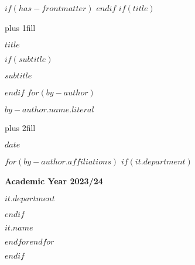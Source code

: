 $if(has-frontmatter)$
\frontmatter
$endif$
$if(title)$
\cleardoublepage
\thispagestyle{empty}
{\centering
\hbox{}\vskip 0cm plus 1fill
{\Huge\bfseries $title$ \par}
$if(subtitle)$
\vspace{3ex}
{\Large\bfseries $subtitle$ \par}
$endif$
\vspace{12ex}
$for(by-author)$
{\Large\bfseries $by-author.name.literal$ \par}
\vskip 0cm plus 2fill
{\bfseries\large $date$ \par}
\vspace{12ex}
$for(by-author.affiliations)$%
$if(it.department)$%
{\bfseries\large Academic Year 2023/24 \par}
\vspace{3ex}
{\bfseries\large $it.department$ \par}
\vspace{3ex}
$endif$%
{\bfseries\large $it.name$ \par}
$endfor$$endfor$%
}

$endif$